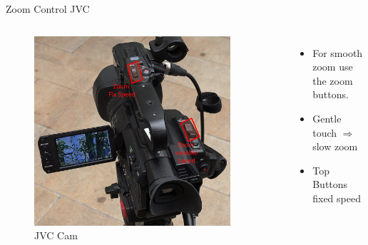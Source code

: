 \documentclass[aspectratio=169]{beamer}
\begin{document}
\begin{frame}{Zoom Control JVC}
	\begin{columns}[T,onlytextwidth]
	\begin{figure} 
		\centering
		\includegraphics[width=0.9\textwidth]{images/jvc_zoom.png}
		\caption{JVC Cam}
	\end{figure}
		\begin{itemize}
			\item For smooth zoom use the zoom buttons.
			\item Gentle touch $\Rightarrow$ slow zoom
			\item Top Buttons fixed speed
		\end{itemize}
	\end{columns}
\end{frame}
\end{document}
